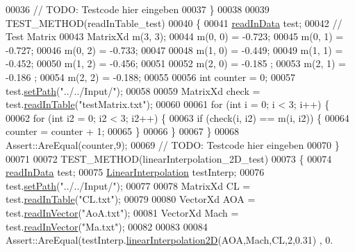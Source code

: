\begin{DoxyCode}
00036             \textcolor{comment}{// TODO: Testcode hier eingeben}
00037         \}
00038 
00039         TEST\_METHOD(readInTable\_test)
00040         \{
00041             \hyperlink{classread_in_data}{readInData} test;
00042             \textcolor{comment}{// Test Matrix}
00043             MatrixXd m(3, 3);
00044             m(0, 0) = -0.723;
00045             m(0, 1) = -0.727;
00046             m(0, 2) = -0.733;
00047 
00048             m(1, 0) = -0.449;
00049             m(1, 1) = -0.452;
00050             m(1, 2) = -0.456;
00051 
00052             m(2, 0) = -0.185 ;
00053             m(2, 1) = -0.186 ;
00054             m(2, 2) = -0.188;
00055 
00056             \textcolor{keywordtype}{int} counter = 0;
00057             test.\hyperlink{classread_in_data_ad67d566fd837f6d721db279144d484e0}{setPath}(\textcolor{stringliteral}{"../../Input/"});
00058 
00059             MatrixXd check = test.\hyperlink{classread_in_data_af616573832efc2c27f07f5f6877b1386}{readInTable}(\textcolor{stringliteral}{"testMatrix.txt"});
00060             
00061             \textcolor{keywordflow}{for} (\textcolor{keywordtype}{int} i = 0; i < 3; i++) \{
00062                 \textcolor{keywordflow}{for} (\textcolor{keywordtype}{int} i2 = 0; i2 < 3; i2++) \{
00063                     \textcolor{keywordflow}{if} (check(i, i2) == m(i, i2)) \{
00064                         counter = counter + 1;
00065                     \}
00066                 \}
00067             \}
00068             Assert::AreEqual(counter,9);
00069             \textcolor{comment}{// TODO: Testcode hier eingeben}
00070         \}
00071 
00072         TEST\_METHOD(linearInterpolation\_2D\_test)
00073         \{
00074             \hyperlink{classread_in_data}{readInData} test;
00075             \hyperlink{class_linear_interpolation}{LinearInterpolation} testInterp;
00076             test.\hyperlink{classread_in_data_ad67d566fd837f6d721db279144d484e0}{setPath}(\textcolor{stringliteral}{"../../Input/"});
00077 
00078             MatrixXd CL = test.\hyperlink{classread_in_data_af616573832efc2c27f07f5f6877b1386}{readInTable}(\textcolor{stringliteral}{"CL.txt"});
00079 
00080             VectorXd AOA = test.\hyperlink{classread_in_data_ab57aff38529234593d786ecace301cf7}{readInVector}(\textcolor{stringliteral}{"AoA.txt"});
00081             VectorXd Mach = test.\hyperlink{classread_in_data_ab57aff38529234593d786ecace301cf7}{readInVector}(\textcolor{stringliteral}{"Ma.txt"});
00082 
00083 
00084             Assert::AreEqual(testInterp.\hyperlink{class_linear_interpolation_aaf48c1f0fa673ada9b8d6218690161f4}{linearInterpolation2D}(AOA,Mach,CL,2,0.31) , 0.

\end{DoxyCode}
